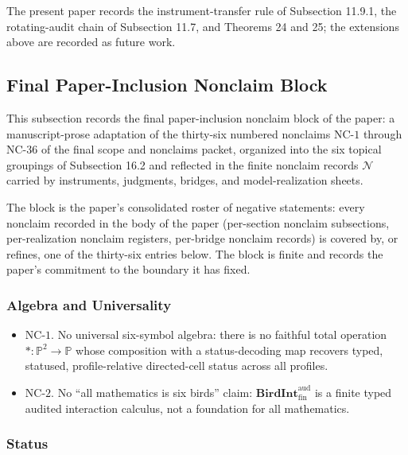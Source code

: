 \documentclass[11pt]{article}
\providecommand{\tightlist}{}
\theoremstyle{definition}
\begin{document}
The present paper records the instrument-transfer rule of Subsection 11.9.1, the rotating-audit chain of Subsection 11.7, and Theorems 24 and 25; the extensions above are recorded as future work.

\subsection{Final Paper-Inclusion Nonclaim Block}

This subsection records the final paper-inclusion nonclaim block of the paper: a manuscript-prose adaptation of the thirty-six numbered nonclaims \(\mathrm{NC}\text{-}1\) through \(\mathrm{NC}\text{-}36\) of the final scope and nonclaims packet, organized into the six topical groupings of Subsection 16.2 and reflected in the finite nonclaim records \(\mathcal N\) carried by instruments, judgments, bridges, and model-realization sheets.

The block is the paper's consolidated roster of negative statements: every nonclaim recorded in the body of the paper (per-section nonclaim subsections, per-realization nonclaim registers, per-bridge nonclaim records) is covered by, or refines, one of the thirty-six entries below. The block is finite and records the paper's commitment to the boundary it has fixed.

\subsubsection{Algebra and Universality}

\begin{itemize}
\tightlist
\item
  \(\mathrm{NC}\text{-}1\). No universal six-symbol algebra: there is no faithful total operation \(\ast:\mathbb P^{2}\to\mathbb P\) whose composition with a status-decoding map recovers typed, statused, profile-relative directed-cell status across all profiles.
\item
  \(\mathrm{NC}\text{-}2\). No ``all mathematics is six birds'' claim: \(\mathbf{BirdInt}^{\mathrm{aud}}_{\mathrm{fin}}\) is a finite typed audited interaction calculus, not a foundation for all mathematics.
\end{itemize}

\subsubsection{Status}
\end{document}
